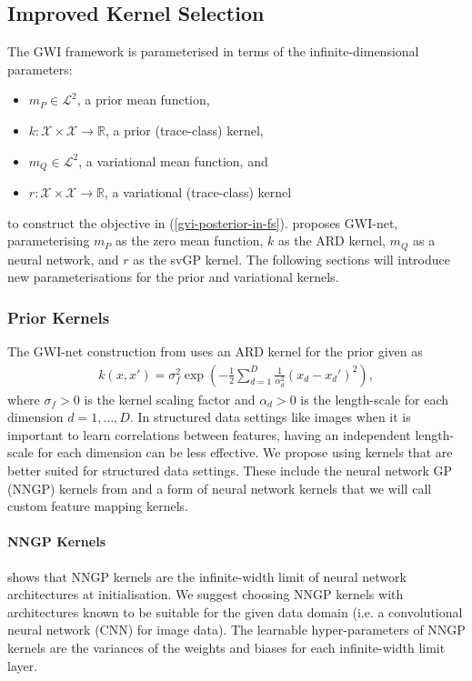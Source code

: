 \documentclass{article}
\numberwithin{equation}{section}
\begin{document}
\subsection{Improved Kernel Selection}
The GWI framework is parameterised in terms of the infinite-dimensional parameters:
\begin{itemize}
    \setlength\itemsep{-0.25em}
    \item $m_P \in \mathcal{L}^2$, a prior mean function,
    \item $k: \mathcal{X} \times \mathcal{X} \rightarrow \mathbb{R}$, a prior (trace-class) kernel,
    \item $m_Q \in \mathcal{L}^2$, a variational mean function, and
    \item $r: \mathcal{X} \times \mathcal{X} \rightarrow \mathbb{R}$, a variational (trace-class) kernel
\end{itemize}
to construct the objective in (\ref{gvi-posterior-in-fs}). \cite{wild2022generalized} proposes GWI-net, parameterising $m_P$ as the zero mean function, $k$ as the ARD kernel, $m_Q$ as a neural network, and $r$ as the svGP kernel.
The following sections will introduce new parameterisations for the prior and variational kernels.

\subsubsection{Prior Kernels}\label{prior-kernels}
The GWI-net construction from \cite{wild2022generalized} uses an ARD kernel for the prior given as
\begin{align}
    k(x, x') = \sigma^2_f \exp\left(-\frac{1}{2} \sum_{d=1}^D \frac{1}{\alpha_d^2}(x_d-x_d')^2\right),
\end{align}
where $\sigma_f > 0$ is the kernel scaling factor and $\alpha_d >0$ is the length-scale for each dimension $d=1, \dots, D$.
In structured data settings like images when it is important to learn correlations between features, having an independent length-scale for each dimension can be less effective.
We propose using kernels that are better suited for structured data settings. These include the neural network GP (NNGP) kernels from \cite{novak2019neural} and a form of neural network kernels that we will call custom feature mapping kernels.

\paragraph{NNGP Kernels} \cite{novak2019neural} shows that NNGP kernels are the infinite-width limit of neural network architectures at initialisation.
We suggest choosing NNGP kernels with architectures known to be suitable for the given data domain (i.e. a convolutional neural network (CNN) for image data).
The learnable hyper-parameters of NNGP kernels are the variances of the weights and biases for each infinite-width limit layer.
\end{document}
